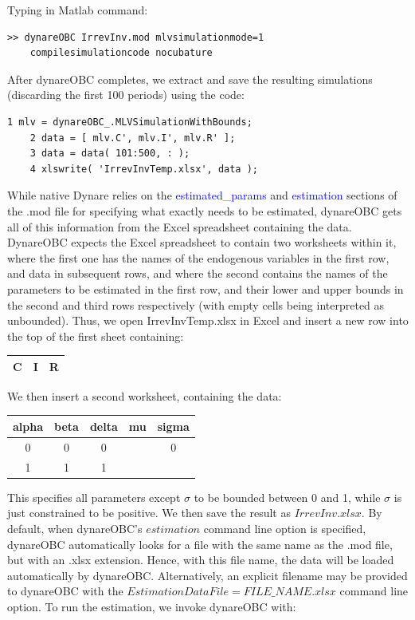 \documentclass[10pt,math=newtx,citestyle=gb7714-2015,bibstyle=gb7714-2015]{elegantbook}
\begin{document}
{Typing in Matlab command:

\begin{lstlisting}[frame=shadowbox]
	>> dynareOBC IrrevInv.mod mlvsimulationmode=1
	compilesimulationcode nocubature
\end{lstlisting}

After dynareOBC completes, we extract and save the resulting simulations (discarding the first 100 periods) using the code:

\begin{lstlisting}[frame=shadowbox]
	1 mlv = dynareOBC_.MLVSimulationWithBounds;
	2 data = [ mlv.C', mlv.I', mlv.R' ];
	3 data = data( 101:500, : );
	4 xlswrite( 'IrrevInvTemp.xlsx', data );
\end{lstlisting}

While native Dynare relies on the \textcolor{blue}{estimated\_params} and \textcolor{blue}{estimation} sections of the .mod file for specifying what exactly needs to be estimated, dynareOBC gets all of this information from the Excel spreadsheet containing the data. DynareOBC expects the Excel spreadsheet to contain two worksheets within it, where the first one has the names of the endogenous variables in the first row, and data in subsequent rows, and where the second contains the names of the
parameters to be estimated in the first row, and their lower and upper bounds in the second and third rows respectively (with empty cells being interpreted as unbounded). Thus, we open IrrevInvTemp.xlsx in Excel and insert a new row into the top of the first sheet containing:

\begin{table}[htbp!]
	\centering
	\begin{tabular}{ccc}
		\hline
		C&I&R\\
		\hline
	\end{tabular}
\end{table}

We then insert a second worksheet, containing the data:
\begin{table}[htbp!]
	\centering
	\begin{tabular}{ccccc}
		\hline
		alpha &beta &delta &mu &sigma\\
		\hline
		0&0&0&&0\\
		1&1&1&&\\
		\hline
	\end{tabular}
\end{table}

This specifies all parameters except $\sigma$ to be bounded between 0 and 1, while $\sigma$ is just constrained to be positive. We then save the result as $IrrevInv.xlsx$. By default, when dynareOBC’s $estimation$ command line option is specified, dynareOBC automatically looks for a file with the same name as the .mod file, but with an .xlsx extension. Hence, with this file name, the data will be loaded automatically by dynareOBC. Alternatively, an explicit filename may be provided
to dynareOBC with the $EstimationDataFile=FILE\_NAME.xlsx$ command line option. To run the estimation, we invoke dynareOBC with:

}
\end{document}
